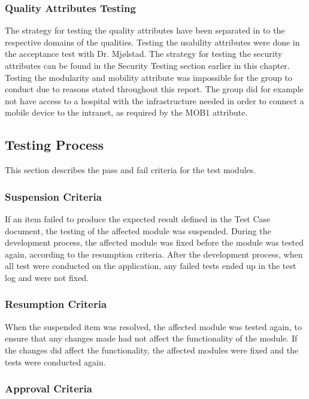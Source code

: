 \subsubsection{Quality Attributes Testing}
The strategy for testing the quality attributes have been separated in to the respective domains of the qualities. Testing the usability attributes were done in the acceptance test with Dr. Mjølstad. The strategy for testing the security attributes can be found in the Security Testing section earlier in this chapter. Testing the modularity and mobility attribute was impossible for the group to conduct due to reasons stated throughout this report. The group did for example not have access to a hospital with the infrastructure needed in order to connect a mobile device to the intranet, as required by the MOB1 attribute.


\subsection{Testing Process}

This section describes the pass and fail criteria for the test modules.

\subsubsection{Suspension Criteria}

If an item failed to produce the expected result defined in the Test Case document, the testing of the affected module was suspended. During the development process, the affected module was fixed before the module was tested again, according to the resumption criteria. After the development process, when all test were conducted on the application, any failed tests ended up in the test log and were not fixed.

\subsubsection{Resumption Criteria}

When the suspended item was resolved, the affected module was tested again, to ensure that any changes made had not affect the functionality of the module. If the changes did affect the functionality, the affected modules were fixed and the tests were conducted again.

\subsubsection{Approval Criteria}

